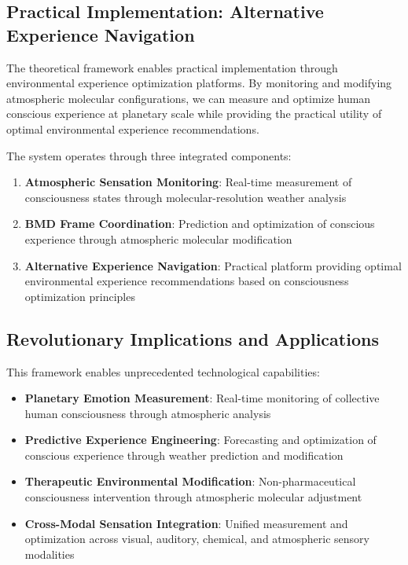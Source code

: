 \documentclass[12pt,a4paper]{article}
\begin{document}
\subsection{Practical Implementation: Alternative Experience Navigation}

The theoretical framework enables practical implementation through environmental experience optimization platforms. By monitoring and modifying atmospheric molecular configurations, we can measure and optimize human conscious experience at planetary scale while providing the practical utility of optimal environmental experience recommendations.

The system operates through three integrated components:
\begin{enumerate}
\item \textbf{Atmospheric Sensation Monitoring}: Real-time measurement of consciousness states through molecular-resolution weather analysis
\item \textbf{BMD Frame Coordination}: Prediction and optimization of conscious experience through atmospheric molecular modification
\item \textbf{Alternative Experience Navigation}: Practical platform providing optimal environmental experience recommendations based on consciousness optimization principles
\end{enumerate}

\subsection{Revolutionary Implications and Applications}

This framework enables unprecedented technological capabilities:
\begin{itemize}
\item \textbf{Planetary Emotion Measurement}: Real-time monitoring of collective human consciousness through atmospheric analysis
\item \textbf{Predictive Experience Engineering}: Forecasting and optimization of conscious experience through weather prediction and modification
\item \textbf{Therapeutic Environmental Modification}: Non-pharmaceutical consciousness intervention through atmospheric molecular adjustment
\item \textbf{Cross-Modal Sensation Integration}: Unified measurement and optimization across visual, auditory, chemical, and atmospheric sensory modalities
\end{itemize}
\end{document}

